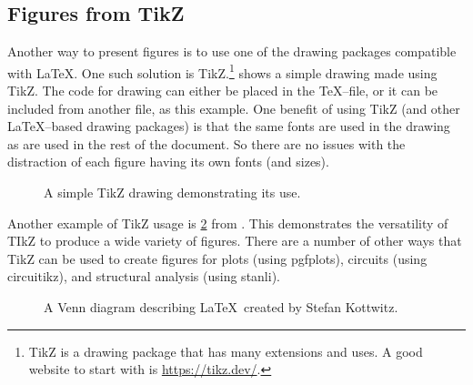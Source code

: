 \subsection{Figures from TikZ} \label{sec:FiguresFromTikZ}
    Another way to present figures is to use one of the drawing packages compatible with \LaTeX.
    One such solution is TikZ.\footnote{TikZ is a drawing package that has many extensions and uses. A good website to start with is \url{https://tikz.dev/}.}
     shows a simple drawing made using TikZ.
    The code for drawing can either be placed in the \TeX--file, or it can be included from another file, as this example.
    One benefit of using TikZ (and other \LaTeX--based drawing packages) is that the same fonts are used in the drawing as are used in the rest of the document.
    So there are no issues with the distraction of each figure having its own fonts (and sizes).
    \begin{figure}
        \centering
        
        \caption{A simple TikZ drawing demonstrating its use.}
        \label{fig:tikz_drawing}
    \end{figure}

    Another example of TikZ usage is \cref{fig:tikz_venn} from \cite{kottwitz2015}.
    This demonstrates the versatility of TIkZ to produce a wide variety of figures.
    There are a number of other ways that TikZ can be used to create figures for plots (using pgfplots), circuits (using circuitikz), and structural analysis (using stanli).
    \begin{figure}
        \centering
        
        \caption{A Venn diagram describing \LaTeX\ created by Stefan Kottwitz\cite{kottwitz2015}.}
        \label{fig:tikz_venn}
    \end{figure}

